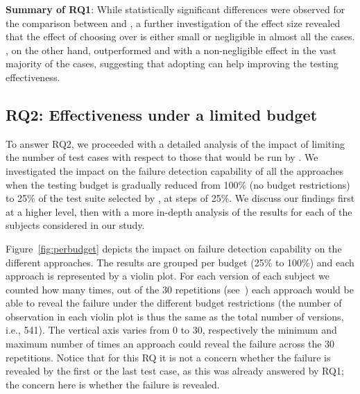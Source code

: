 \begin{tcolorbox}%
\textbf{Summary of RQ1}: While statistically significant differences were observed for the comparison between \ek and \fs, a further investigation of the effect size revealed that the effect of choosing \ek over \fs is either small or negligible in almost all the cases.
\fz, on the other hand, outperformed \ek and \fs with a non-negligible effect in the vast majority of the cases, suggesting that adopting \fz can help improving the testing effectiveness.
\end{tcolorbox}


\subsection{RQ2: Effectiveness under a limited budget}
\label{subsec:rq2}

To answer RQ2, we proceeded with a detailed analysis of the impact of limiting the number of test cases with respect to those that would be run by \ek. 
We investigated the impact on the failure detection capability of all the approaches 
when the testing budget is gradually reduced from 100\% (no budget restrictions) 
to 25\% of the test suite selected by \ek, at steps of 25\%.
%
We discuss our findings first at a higher level, then with a more in-depth analysis of the results for each of the subjects considered in our study.


Figure~\ref{fig:perbudget} depicts the impact on failure detection capability on the different approaches.
The results are grouped per budget 
(25\% to 100\%) 
and each approach is represented by a violin plot.
For each version of each subject 
we counted how many times, out of the 30 repetitions (see~)
each approach would be able to reveal the failure under the different budget restrictions 
(the number of observation in each violin plot is thus the same as the total number of versions, i.e., 541).
The vertical axis varies from 0 to 30, respectively the minimum and maximum number of times an approach could reveal the failure across the 30 repetitions.
Notice that for this RQ it is not a concern whether the failure is revealed by the first or the last test case, 
as this was already answered by RQ1; the  concern here is whether the failure is revealed.

